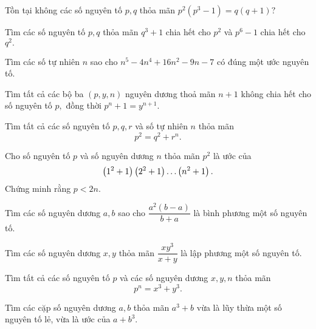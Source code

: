 \begin{btt}
Tồn tại không các số nguyên tố $p,q$ thỏa mãn $p^2\left(p^3-1\right)=q(q+1)?$
\end{btt}

\begin{btt}
Tìm các số nguyên tố $p,q$ thỏa mãn $q^3+1$ chia hết cho $p^2$ và $p^6-1$ chia hết cho $q^2.$
\end{btt}

\begin{btt}
Tìm các số tự nhiên $n$ sao cho $n^5-4n^4+16n^2-9n-7$ có đúng một ước nguyên tố.
\end{btt}

\begin{btt}
Tìm tất cả các bộ ba $\left( p,y,n \right)$ nguyên dương thoả mãn $n+1$ không chia hết cho số nguyên tố $p,$ đồng thời $p^n+1=y^{n+1}.$
\end{btt}

\begin{btt}
Tìm tất cả các số nguyên tố $p,q,r$ và số tự nhiên $n$ thỏa mãn
$$p^2=q^2+r^n.$$
\end{btt}

\begin{btt}
Cho số nguyên tố $p$ và số nguyên dương $n$ thỏa mãn $p^2$ là ước của 
$$\left(\displaystyle 1^2+1 \right)\left(\displaystyle 2^2+1 \right)\ldots\left(\displaystyle n^2+1 \right).$$
Chứng minh rằng $p<2n.$
\end{btt}

\begin{btt}
Tìm các số nguyên dương $a, b$ sao cho $\dfrac{a^2(b-a)}{b+a}$ là bình phương một số nguyên tố.
\end{btt}

\begin{btt}
Tìm các số nguyên dương $x,y$ thỏa mãn $\dfrac{x y^{3}}{x+y}$ là lập phương một số nguyên tố.
\end{btt}

\begin{btt}
Tìm tất cả các số nguyên tố $p$ và các số nguyên dương $x,y,n$ thỏa mãn
\[p^n=x^3+y^3.\]
\end{btt}

\begin{btt}
Tìm các cặp số nguyên dương $a,b$ thỏa mãn $a^3+b$ vừa là lũy thừa một số nguyên tố lẻ, vừa là ước của $a+b^3.$
\end{btt}

